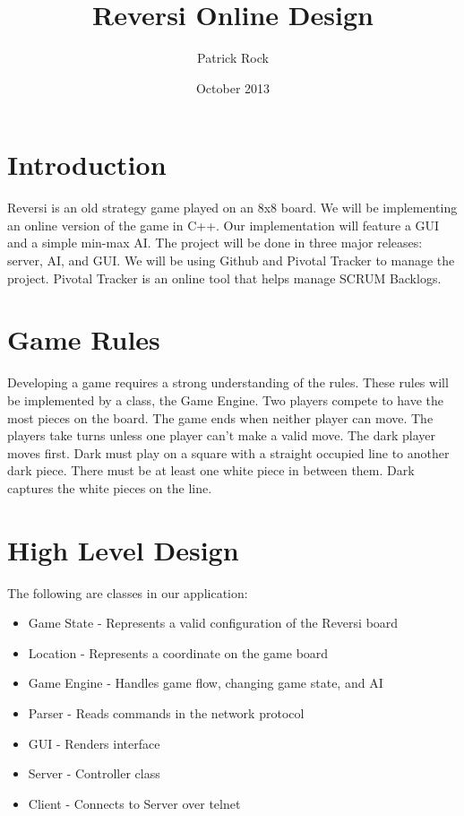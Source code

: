 \documentclass{article}
\title{Reversi Online Design}
\author{Patrick Rock}
\date{October 2013}
\begin{document}
\maketitle

\section{Introduction}
Reversi is an old strategy game played on an 8x8 board. We will be implementing
an online version of the game in C++. Our implementation will feature a GUI and a simple
min-max AI. The project will be done in three major releases: server, AI, and GUI.
We will be using Github and Pivotal Tracker to manage the project. Pivotal Tracker
is an online tool that helps manage SCRUM Backlogs.

\section{Game Rules}
Developing a game requires a strong understanding of the rules. These rules will
be implemented by a class, the Game Engine.
Two players compete to have the most pieces on the board. 
The game ends when neither player can move.
The players take turns unless one player can't make a valid move. 
The dark player moves first.
Dark must play on a square with a straight occupied line to another dark piece. There 
must be at least one white piece in between them. Dark captures the white pieces
on the line.

\section{High Level Design}
The following are classes in our application:
\begin{itemize}
\item Game State   - Represents a valid configuration of the Reversi board
\item Location     - Represents a coordinate on the game board
\item Game Engine  - Handles game flow, changing game state, and AI
\item Parser       - Reads commands in the network protocol 
\item GUI          - Renders interface
\item Server       - Controller class
\item Client       - Connects to Server over telnet
\end{itemize}
\end{document}
